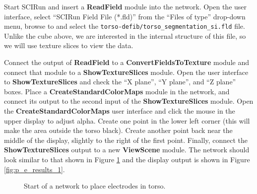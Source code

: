 \documentclass[fleqn,11pt,openany]{book}
\begin{document}
Start SCIRun and insert a {\bf ReadField} module into the
network. Open the user interface, select ``SCIRun Field File (*.fld)''
from the ``Files of type'' drop-down menu, browse to and select the
{\tt torso-defib/torso\_segmentation\_si.fld} file. Unlike the cube above, we are
interested in the internal structure of this file, so we will use
texture slices to view the data.

Connect the output of {\bf ReadField} to a {\bf
ConvertFieldsToTexture} module and connect that module to a {\bf
ShowTextureSlices} module. Open the user interface to {\bf
ShowTextureSlices} and check the ``X plane'', ``Y plane'', and ``Z
plane'' boxes. Place a {\bf CreateStandardColorMaps} module in the
network, and connect its output to the second input of the {\bf
ShowTextureSlices} module. Open the {\bf CreateStandardColorMaps} user
interface and click the mouse in the upper display to adjust
alpha. Create one point in the lower left corner (this will make the
area outside the torso black). Create another point back near the
middle of the display, slightly to the right of the first
point. Finally, connect the {\bf ShowTextureSlices} output to a new
{\bf ViewScene} module. The network should look similar to that shown
in Figure \ref{fig:p_e_network_1} and the display output is shown in
Figure \ref{fig:p_e_results_1}.
 
\begin{figure}
\caption{Start of a network to place electrodes in
torso.}\label{fig:p_e_network_1}
\end{figure}
\end{document}
